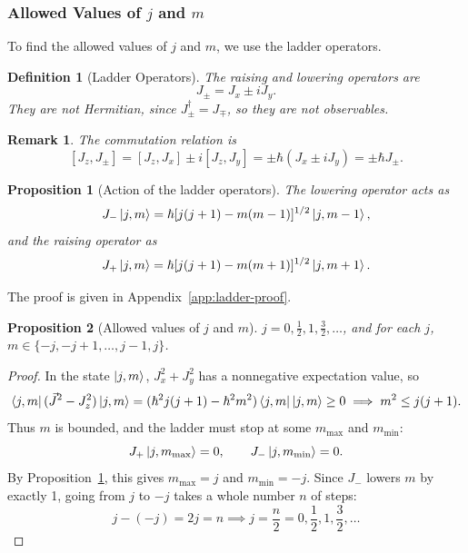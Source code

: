 \documentclass{article}
\newtheorem{definition}{Definition}
\newtheorem{remark}{Remark}
\newtheorem{proposition}{Proposition}
\begin{document}
\subsubsection{Allowed Values of $j$ and $m$}
To find the allowed values of $j$ and $m$, we use the ladder operators.
\begin{definition}[Ladder Operators]
    \label{def:ladder}
    The raising and lowering operators are
    \begin{equation}
        J_\pm = J_x \pm iJ_y.
    \end{equation}
    They are not Hermitian, since $J_\pm^\dagger = J_\mp$, so they are not observables.
\end{definition}
\begin{remark}
    The commutation relation is
    \[[J_z, J_\pm] = [J_z,J_x] \pm i[J_z,J_y] = \pm\hbar(J_x\pm i J_y) = \pm\hbar J_\pm.\]
\end{remark}
\begin{proposition}[Action of the ladder operators]
    \label{prop:ladder}
    The lowering operator acts as
    \begin{equation}
        J_-\ket{j,m} = \hbar[j(j+1)-m(m-1)]^{1/2}\ket{j,m-1},
    \end{equation}
    and the raising operator as
    \begin{equation}
        J_+\ket{j,m} = \hbar[j(j+1)-m(m+1)]^{1/2}\ket{j,m+1}.
    \end{equation}
\end{proposition}
The proof is given in Appendix~\ref{app:ladder-proof}.
\begin{proposition}[Allowed values of $j$ and $m$]
    $j = 0, \frac{1}{2}, 1, \frac{3}{2}, \ldots$, and for each $j$, $m \in \{-j, -j+1, \ldots, j-1, j\}$.
\end{proposition}
\begin{proof}
    In the state $\ket{j,m}$, $J_x^2 + J_y^2$ has a nonnegative expectation value, so
    \begin{equation*}
        \bra{j,m}(\vec{J}^2 - J_z^2)\ket{j,m} = (\hbar^2 j(j+1) - \hbar^2 m^2)\bra{j,m}\ket{j,m} \geq 0 \implies m^2 \leq j(j+1).
    \end{equation*}
    Thus $m$ is bounded, and the ladder must stop at some $m_{\max}$ and $m_{\min}$:
    \begin{equation*}
        J_+\ket{j,m_{\max}} = 0, \qquad J_-\ket{j,m_{\min}} = 0.
    \end{equation*}
    By Proposition~\ref{prop:ladder}, this gives $m_{\max} = j$ and $m_{\min} = -j$. Since $J_-$ lowers $m$ by exactly 1, going from $j$ to $-j$ takes a whole number $n$ of steps:
    \begin{equation*}
        j - (-j) = 2j = n \implies j = \frac{n}{2} = 0, \frac{1}{2}, 1, \frac{3}{2}, \ldots
    \end{equation*}
\end{proof}
\end{document}

